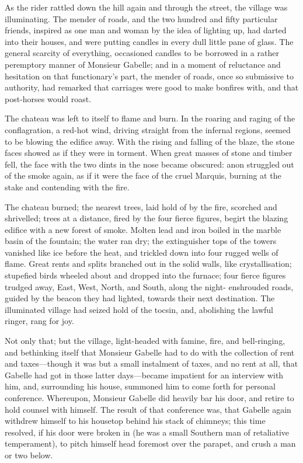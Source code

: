 As the rider rattled down the hill again and through the street, the
village was illuminating.  The mender of roads, and the two hundred
and fifty particular friends, inspired as one man and woman by the
idea of lighting up, had darted into their houses, and were putting
candles in every dull little pane of glass.  The general scarcity of
everything, occasioned candles to be borrowed in a rather peremptory
manner of Monsieur Gabelle; and in a moment of reluctance and hesitation
on that functionary's part, the mender of roads, once so submissive
to authority, had remarked that carriages were good to make bonfires
with, and that post-horses would roast.

The chateau was left to itself to flame and burn.  In the roaring and
raging of the conflagration, a red-hot wind, driving straight from
the infernal regions, seemed to be blowing the edifice away.  With the
rising and falling of the blaze, the stone faces showed as if they were
in torment.  When great masses of stone and timber fell, the face with
the two dints in the nose became obscured:  anon struggled out of the
smoke again, as if it were the face of the cruel Marquis, burning at
the stake and contending with the fire.

The chateau burned; the nearest trees, laid hold of by the fire,
scorched and shrivelled; trees at a distance, fired by the four fierce
figures, begirt the blazing edifice with a new forest of smoke.  Molten
lead and iron boiled in the marble basin of the fountain; the water
ran dry; the extinguisher tops of the towers vanished like ice before
the heat, and trickled down into four rugged wells of flame.  Great
rents and splits branched out in the solid walls, like crystallisation;
stupefied birds wheeled about and dropped into the furnace; four fierce
figures trudged away, East, West, North, and South, along the night-%
enshrouded roads, guided by the beacon they had lighted, towards their
next destination.  The illuminated village had seized hold of the
tocsin, and, abolishing the lawful ringer, rang for joy.

Not only that; but the village, light-headed with famine, fire, and
bell-ringing, and bethinking itself that Monsieur Gabelle had to do
with the collection of rent and taxes---though it was but a small
instalment of taxes, and no rent at all, that Gabelle had got in those
latter days---became impatient for an interview with him, and,
surrounding his house, summoned him to come forth for personal conference.
Whereupon, Monsieur Gabelle did heavily bar his door, and retire to
hold counsel with himself.  The result of that conference was, that
Gabelle again withdrew himself to his housetop behind his stack of
chimneys; this time resolved, if his door were broken in (he was a
small Southern man of retaliative temperament), to pitch himself head
foremost over the parapet, and crush a man or two below.

